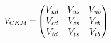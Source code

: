 \begin{comment}
Comparing  Equation \ref{cp-conj} and \ref{weak_coupling}, the $\it{CP}$ symmetry requires the invariance before and after $CP$ conjugation, meaning that Equation \ref{cp_cons} is expected.

\begin{equation}\label{cp_cons}
\large
{u_{L}^i}V_{ij} \bar{d}^{j}_L \gamma^\mu W^{-}_{\mu}
=
{{u}^{n}_LV^{*}_{nm}\bar{d}_{L}^m}  \gamma^\mu W^{-}_{\mu}
\end{equation}
The same indices $ij$ and $nm$ are summed over on both side. This is equivalent to Equation \ref{v-eq}: 
\begin{equation}\label{v-eq}
V_{ij} = V^{*}_{ij}
\end{equation}

On the one hand, if the CKM matrix is real, $CP$ will be conserved in the weak interaction in the SM due to the natural hold of Equation \ref{v-eq}. On the other hand, from Equation \ref{cp_cons}, it's still possible to make Lagrangian invariant even if $V_{CKM}$ is not real, which can be achieved by introducing non-physical phases for each quark field $u^k_L e^{(i\phi_{uk})}$ and $d^j_L e^{(i\phi_{dj})}$, the Equation \ref{v-eq} becomes Equation \ref{eq:ckm_phase}.
\begin{equation}\label{eq:ckm_phase}
\Large
V_{kj} e^{i(\phi_{dj}-\phi_{uk})} = V^{*}_{kj}e^{i(\phi_{uk}-\phi_{dj})}
\end{equation}

Assuming the complex phase of the $kj$-th element in CKM matrix is $\theta_{kj}$, it's obviously required Equation \ref{eq:ckm_phaseeq} to hold.
\begin{equation}\label{eq:ckm_phaseeq}
\large
\theta_{kj} = \phi_{uk}-\phi_{dj}
\end{equation}
If the number of generations in quark family is 3 or more, the non-physical phases can not render proper values to ensure the hold of Equation \ref{eq:ckm_phaseeq}, and there will always be one irreducible complex phase parameter in the CKM matrix in the existence of three generations of quarks, which means $\it{CP}$ symmetry is no longer conserved in the weak interactions. 
\end{comment}
\begin{equation}\label{CKM}
\large
V_{CKM}=
\begin{pmatrix}
V_{ud} & V_{us} & V_{ub}\\
V_{cd} & V_{cs} & V_{cb}\\
V_{td} & V_{ts} & V_{tb}\\
\end{pmatrix}
\end{equation}
